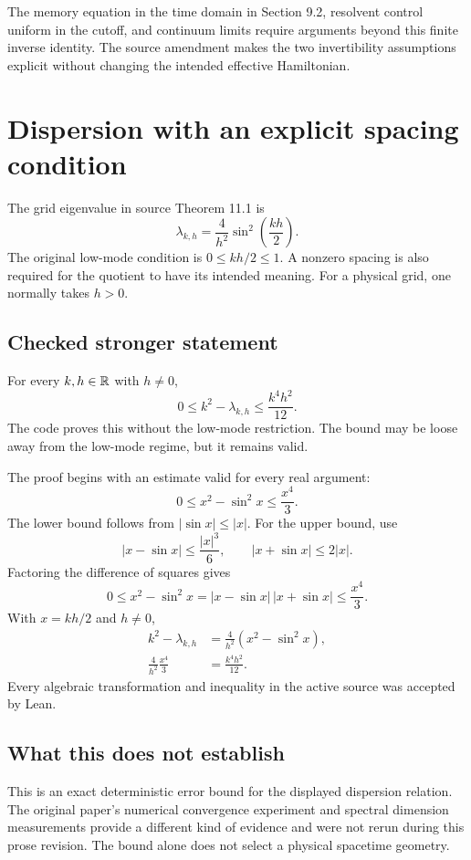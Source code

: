 The memory equation in the time domain in Section 9.2, resolvent control uniform in the cutoff, and continuum limits require arguments beyond this finite inverse identity. The source amendment makes the two invertibility assumptions explicit without changing the intended effective Hamiltonian.



\section{Dispersion with an explicit spacing condition}\label{supp1:section:004}
The grid eigenvalue in source Theorem 11.1 is
\[
\lambda_{k,h}=\frac{4}{h^2}\sin^2\left(\frac{kh}{2}\right).
\]
The original low-mode condition is $0\le kh/2\le1$. A nonzero spacing is also required for the quotient to have its intended meaning. For a physical grid, one normally takes $h>0$.

\subsection{Checked stronger statement}
For every $k,h\in\R$ with $h\ne0$,
\[
\boxed{0\le k^2-\lambda_{k,h}\le\frac{k^4h^2}{12}.}
\]
The code proves this without the low-mode restriction. The bound may be loose away from the low-mode regime, but it remains valid.

The proof begins with an estimate valid for every real argument:
\[
0\le x^2-\sin^2x\le\frac{x^4}{3}.
\]
The lower bound follows from $|\sin x|\le|x|$. For the upper bound, use
\[
|x-\sin x|\le\frac{|x|^3}{6},\qquad
|x+\sin x|\le2|x|.
\]
Factoring the difference of squares gives
\[
0\le x^2-\sin^2x
=|x-\sin x|\,|x+\sin x|
\le\frac{x^4}{3}.
\]
With $x=kh/2$ and $h\ne0$,
\begin{align*}
k^2-\lambda_{k,h}
&=\frac4{h^2}\left(x^2-\sin^2x\right),\\
\frac4{h^2}\frac{x^4}{3}
&=\frac{k^4h^2}{12}.
\end{align*}
Every algebraic transformation and inequality in the active source was accepted by Lean.



\subsection{What this does not establish}
This is an exact deterministic error bound for the displayed dispersion relation. The original paper's numerical convergence experiment and spectral dimension measurements provide a different kind of evidence and were not rerun during this prose revision. The bound alone does not select a physical spacetime geometry.



